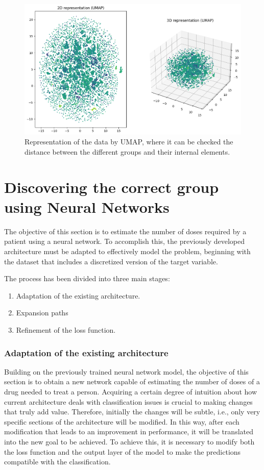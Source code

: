 \begin{figure}[H]
    \centering
    \includegraphics[width=1\textwidth]{figures/data_representation/umap.png}
    \caption{Representation of the data by UMAP, where it can be checked the distance between the different groups and their internal elements.}
    \label{fig:umap}
\end{figure}


\section{Discovering the correct group using Neural Networks}

The objective of this section is to estimate the number of doses required by a patient using a neural network. To accomplish this, the previously developed architecture must be adapted to effectively model the problem, beginning with the dataset that includes a discretized version of the target variable.

The process has been divided into three main stages:

\begin{enumerate}
    \item Adaptation of the existing architecture.
    \item Expansion paths
    \item Refinement of the loss function.
\end{enumerate}

\subsubsection{Adaptation of the existing architecture}

Building on the previously trained neural network model, the objective of this section is to obtain a new network capable of estimating the number of doses of a drug needed to treat a person. 
Acquiring a certain degree of intuition about how current architecture deals with classification issues is crucial to making changes that truly add value. Therefore, initially the changes will be subtle, i.e., only very specific sections of the architecture will be modified. In this way, after each modification that leads to an improvement in performance, it will be translated into the new goal to be achieved. To achieve this, it is necessary to modify both the loss function and the output layer of the model to make the predictions compatible with the classification.

